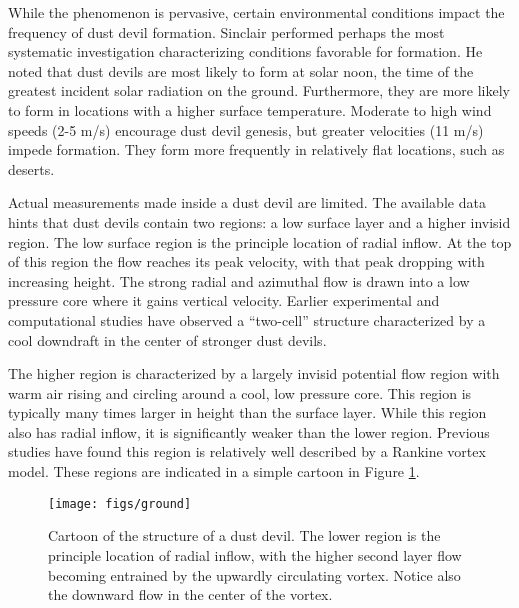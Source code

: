 While the phenomenon is pervasive, certain environmental conditions
impact the frequency of dust devil formation. 
Sinclair\cite{Sinclair1969} performed perhaps the most 
systematic investigation characterizing conditions favorable for
formation. He noted that dust devils are most
likely to form at solar noon, the time of the greatest incident solar
radiation  on the ground. Furthermore, they are more likely to form in
locations with a higher surface temperature. Moderate to high wind
speeds (2-5 m/s) encourage dust devil genesis, but greater velocities
(11 m/s) impede formation. They form more frequently in relatively flat
locations, such as deserts.   

%
%

Actual measurements made inside a dust devil are limited. The available data
hints that dust devils contain two regions: a low surface layer and a
higher invisid region. The low surface region is the  principle location
of radial inflow. At the top of this region the flow 
reaches its peak velocity, with that peak dropping with increasing height. 
The strong radial and azimuthal flow is drawn into a low pressure core 
where it gains vertical velocity. Earlier experimental and 
computational studies have observed a ``two-cell'' structure
characterized by a cool downdraft in the center of stronger dust
devils\cite{doi:10.3137/ao.420105,Sinclair1973}. 

The higher region is characterized by a largely invisid potential flow
region with warm air rising and circling around a cool, low pressure
core. This region is typically many times larger in height than the
surface layer. While this region also has radial inflow, it is
significantly weaker than the lower region. Previous studies have found
this region is relatively well described by a Rankine vortex
model\cite{Sinclair1973}. These regions are indicated in a 
simple cartoon in Figure \ref{fig:cartoon}.

  \begin{figure}[!htb]
    \begin{center}
     \texttt{[image: figs/ground]}
     \caption{Cartoon of the structure of a dust devil. The lower region
     is the principle location of radial inflow, with the higher second
     layer flow becoming entrained by the upwardly circulating
     vortex. Notice also the downward flow in the center of the vortex.}
     \label{fig:cartoon}
    \end{center}
  \end{figure}


